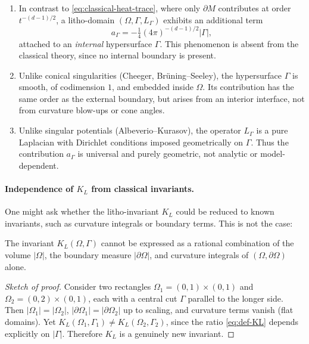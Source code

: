 \begin{enumerate}
\item In contrast to \eqref{eq:classical-heat-trace}, where only
$\partial M$ contributes at order $t^{-(d-1)/2}$,
a litho-domain $(\Omega,\Gamma,L_\Gamma)$ exhibits an additional term
\[
a_\Gamma = -\tfrac14(4\pi)^{-(d-1)/2}|\Gamma|,
\]
attached to an \emph{internal} hypersurface $\Gamma$.
This phenomenon is absent from the classical theory, since
no internal boundary is present.

\item Unlike conical singularities (Cheeger, Brüning–Seeley),
the hypersurface $\Gamma$ is smooth, of codimension $1$, and embedded inside $\Omega$.
Its contribution has the same order as the external boundary,
but arises from an interior interface, not from curvature blow-ups or cone angles.

\item Unlike singular potentials (Albeverio–Kurasov),
the operator $L_\Gamma$ is a pure Laplacian with Dirichlet
conditions imposed geometrically on $\Gamma$.
Thus the contribution $a_\Gamma$ is universal and purely geometric,
not analytic or model-dependent.
\end{enumerate}

\paragraph{Independence of $K_L$ from classical invariants.}
One might ask whether the litho-invariant $K_L$
could be reduced to known invariants, such as curvature integrals
or boundary terms. This is not the case:

\begin{proposition}
The invariant $K_L(\Omega,\Gamma)$ cannot be expressed as a rational
combination of the volume $|\Omega|$, the boundary measure $|\partial\Omega|$,
and curvature integrals of $(\Omega,\partial\Omega)$ alone.
\end{proposition}

\begin{proof}[Sketch of proof]
Consider two rectangles $\Omega_1=(0,1)\times(0,1)$
and $\Omega_2=(0,2)\times(0,1)$, each with a central cut $\Gamma$
parallel to the longer side. Then
$|\Omega_1|=|\Omega_2|$, $|\partial\Omega_1|=|\partial\Omega_2|$ up to scaling,
and curvature terms vanish (flat domains).
Yet $K_L(\Omega_1,\Gamma_1)\neq K_L(\Omega_2,\Gamma_2)$,
since the ratio \eqref{eq:def-KL} depends explicitly on $|\Gamma|$.
Therefore $K_L$ is a genuinely new invariant.
\end{proof}

